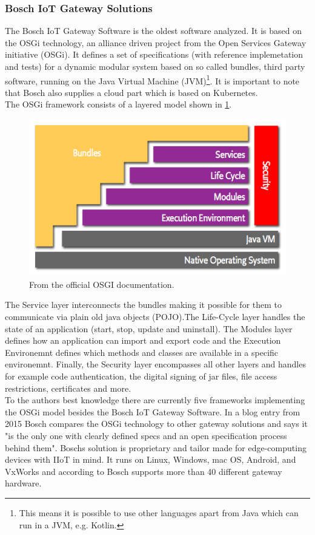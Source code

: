 \subsubsection{Bosch IoT Gateway Solutions}
The Bosch IoT Gateway Software\cite{BoschIoT13:online} is the oldest software analyzed. It is based on the OSGi technology\cite{osgiDefintion25:online}, an alliance driven project from the Open Services Gateway initiative (OSGi). It defines a set of specifications (with reference implemetation and tests) for a dynamic modular system based on so called bundles, third party software, running on the Java Virtual Machine (JVM)\footnote{This means it is possible to use other languages apart from Java which can run in a JVM, e.g. Kotlin.}. It is important to note that Bosch also supplies a cloud part which is based on Kubernetes.\\
The OSGi framework consists of a layered model shown in \cref{fig:osgiLayerModel}. 
\begin{figure}[h!]
    \centering
    \includegraphics[scale=0.8]{figures/layering-osgi.png}
    \caption{From the official OSGI documentation\cite{osgiFrameworkArchitec22:online}.}
    \label{fig:osgiLayerModel}
\end{figure}
The Service layer interconnects the bundles making it possible for them to communicate via plain old java objects (POJO).The Life-Cycle layer handles the state of an application (start, stop, update and uninstall). The Modules layer defines how an application can import and export code and the Execution Environemnt defines which methods and classes are available in a specific environemnt. Finally, the Security layer encompasses all other layers and handles for example code authentication, the digital signing of jar files, file access restrictions, certificates and more.\\
To the authors best knowledge there are currently five frameworks implementing the OSGi model besides the Bosch IoT Gateway Software\cite{BoschIoT13:online}. In a blog entry from 2015 Bosch compares the OSGi technology to other gateway solutions and says it "is the only one with clearly defined specs and an open specification process behind them"\cite{boschBlogOSGi69:online}. Boschs solution is proprietary and tailor made for edge-computing devices with IIoT in mind\cite{OSGiforIoTBlog27:online}. It runs on Linux, Windows, mac OS, Android, and VxWorks and according to Bosch supports more than 40 different gateway hardware\cite{BoschIoT13:online}. 

